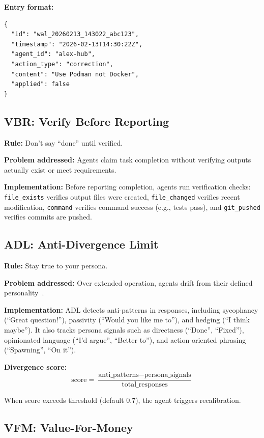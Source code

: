 \documentclass[conference]{IEEEtran}
\begin{document}
\textbf{Entry format:}
\begin{lstlisting}[style=jsoncode]
{
  "id": "wal_20260213_143022_abc123",
  "timestamp": "2026-02-13T14:30:22Z",
  "agent_id": "alex-hub",
  "action_type": "correction",
  "content": "Use Podman not Docker",
  "applied": false
}
\end{lstlisting}

\subsection{VBR: Verify Before Reporting}

\textbf{Rule:} Don't say ``done'' until verified.

\textbf{Problem addressed:} Agents claim task completion without verifying outputs actually exist or meet requirements.

\textbf{Implementation:} Before reporting completion, agents run verification checks: \texttt{file\_exists} verifies output files were created, \texttt{file\_changed} verifies recent modification, \texttt{command} verifies command success (e.g., tests pass), and \texttt{git\_pushed} verifies commits are pushed.

\subsection{ADL: Anti-Divergence Limit}

\textbf{Rule:} Stay true to your persona.

\textbf{Problem addressed:} Over extended operation, agents drift from their defined personality~\cite{park2023generative, sharma2023sycophancy}.

\textbf{Implementation:} ADL detects anti-patterns in responses, including sycophancy (``Great question!''), passivity (``Would you like me to''), and hedging (``I think maybe''). It also tracks persona signals such as directness (``Done'', ``Fixed''), opinionated language (``I'd argue'', ``Better to''), and action-oriented phrasing (``Spawning'', ``On it'').

\textbf{Divergence score:}
\begin{equation}
\text{score} = \frac{\text{anti\_patterns} - \text{persona\_signals}}{\text{total\_responses}}
\end{equation}

When score exceeds threshold (default 0.7), the agent triggers recalibration.

\subsection{VFM: Value-For-Money}
\end{document}
